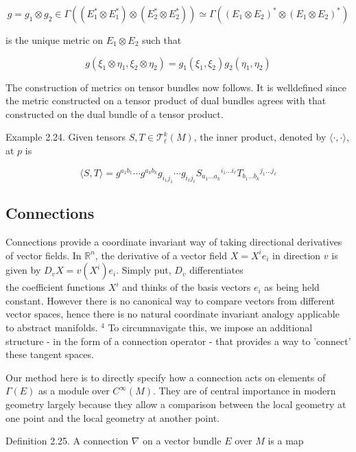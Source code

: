 \documentclass[10pt, letterpaper]{article}
\begin{document}
$$
g=g_{1} \otimes g_{2} \in \Gamma\left(\left(E_{1}^{*} \otimes E_{1}^{*}\right) \otimes\left(E_{2}^{*} \otimes E_{2}^{*}\right)\right) \simeq \Gamma\left(\left(E_{1} \otimes E_{2}\right)^{*} \otimes\left(E_{1} \otimes E_{2}\right)^{*}\right)
$$

is the unique metric on $E_{1} \otimes E_{2}$ such that

$$
g\left(\xi_{1} \otimes \eta_{1}, \xi_{2} \otimes \eta_{2}\right)=g_{1}\left(\xi_{1}, \xi_{2}\right) g_{2}\left(\eta_{1}, \eta_{2}\right)
$$

The construction of metrics on tensor bundles now follows. It is welldefined since the metric constructed on a tensor product of dual bundles agrees with that constructed on the dual bundle of a tensor product.

Example 2.24. Given tensors $S, T \in \mathscr{T}_{\ell}^{k}(M)$, the inner product, denoted by $\langle\cdot, \cdot\rangle$, at $p$ is

$$
\langle S, T\rangle=g^{a_{1} b_{1}} \cdots g^{a_{k} b_{k}} g_{i_{1} j_{1}} \cdots g_{i_{\ell} j_{\ell}} S_{a_{1} \ldots a_{k}}{ }^{i_{1} \ldots i_{\ell}} T_{b_{1} \ldots b_{k}}{ }^{j_{1} \ldots j_{\ell}}
$$

\subsection*{Connections}
Connections provide a coordinate invariant way of taking directional derivatives of vector fields. In $\mathbb{R}^{n}$, the derivative of a vector field $X=X^{i} e_{i}$ in direction $v$ is given by $D_{v} X=v\left(X^{i}\right) e_{i}$. Simply put, $D_{v}$ differentiates\\
the coefficient functions $X^{i}$ and thinks of the basis vectors $e_{i}$ as being held constant. However there is no canonical way to compare vectors from different vector spaces, hence there is no natural coordinate invariant analogy applicable to abstract manifolds. ${ }^{4}$ To circumnavigate this, we impose an additional structure - in the form of a connection operator - that provides a way to 'connect' these tangent spaces.

Our method here is to directly specify how a connection acts on elements of $\Gamma(E)$ as a module over $C^{\infty}(M)$. They are of central importance in modern geometry largely because they allow a comparison between the local geometry at one point and the local geometry at another point.

Definition 2.25. A connection $\nabla$ on a vector bundle $E$ over $M$ is a map
\end{document}
